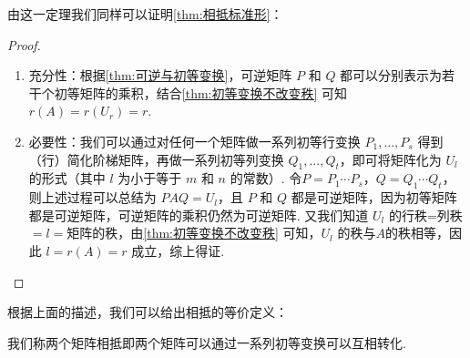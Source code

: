 由这一定理我们同样可以证明\autoref{thm:相抵标准形}：
\begin{proof}
    \begin{enumerate}
        \item 充分性：根据\autoref{thm:可逆与初等变换}，可逆矩阵 $P$ 和 $Q$ 都可以分别表示为若干个初等矩阵的乘积，结合\autoref{thm:初等变换不改变秩} 可知 $r(A) = r(U_r) = r$.
        \item 必要性：我们可以通过对任何一个矩阵做一系列初等行变换 $P_1,\ldots,P_s$ 得到（行）简化阶梯矩阵，再做一系列初等列变换 $Q_1,\ldots,Q_t$，即可将矩阵化为 $U_l$ 的形式（其中 $l$ 为小于等于 $m$ 和 $n$ 的常数）. 令$P = P_1 \cdots P_s$，$Q = Q_1 \cdots Q_t$，则上述过程可以总结为 $PAQ = U_l$，且 $P$ 和 $Q$ 都是可逆矩阵，因为初等矩阵都是可逆矩阵，可逆矩阵的乘积仍然为可逆矩阵. 又我们知道 $U_l$ 的行秩=列秩$=l=$矩阵的秩，由\autoref{thm:初等变换不改变秩} 可知，$U_l$ 的秩与$A$的秩相等，因此 $l = r(A) = r$ 成立，综上得证.
    \end{enumerate}
\end{proof}

根据上面的描述，我们可以给出相抵的等价定义：
\begin{definition}{}{}
    我们称两个矩阵相抵即两个矩阵可以通过一系列初等变换可以互相转化.
\end{definition}

